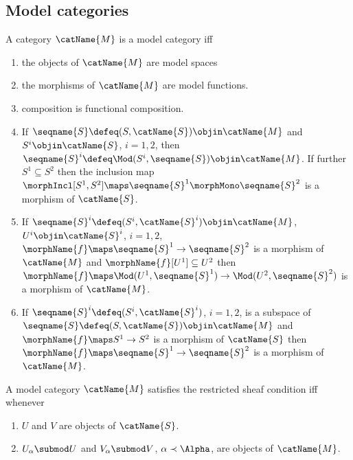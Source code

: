 \documentclass{article}
\begin{document}
\subsection{Model categories}
\begin{definition}
\label{def:modcat}
A category $\catName{M}$ is a model category iff

\begin{enumerate}
\item the objects of $\catName{M}$ are model spaces

\item the morphisms of $\catName{M}$ are model functions.

\item composition is functional composition.

\item
\label{modcat:inc}
If $\seqname{S} \defeq (S, \catName{S}) \objin \catName{M}$ and
$S^i \objin \catName{S}$, $i=1,2$, then
$\seqname{S}^i \defeq \Mod(S^i,\seqname{S}) \objin \catName{M}$.
If further $S^1 \subseteq S^2$ then the inclusion map
$\morphIncl[S^1,S^2] \maps \seqname{S}^1 \morphMono \seqname{S}^2$ is a morphism
of $\catName{S}$.

\item
\label{modcat:rest}
If $\seqname{S}^i \defeq (S^i, \catName{S}^i) \objin \catName{M}$,
$U^i \objin \catName{S}^i$,
$i=1,2$, $\morphName{f} \maps \seqname{S}^1 \to \seqname{S}^2$ is a
morphism of $\catName{M}$ and $\morphName{f}[U^1] \subseteq U^2$ then
$\morphName{f} \maps \Mod(U^1,\seqname{S}^1) \to \Mod(U^2,\seqname{S}^2)$
is a morphism of $\catName{M}$.

\item
\label{modcat:morph}
If $\seqname{S}^i \defeq ({S}^i, \catName{S}^i)$, $i=1,2$, is a
subspace of $\seqname{S} \defeq (S, \catName{S}) \objin \catName{M}$
and $\morphName{f} \maps S^1 \to S^2$ is a morphism of $\catName{S}$ then
$\morphName{f} \maps \seqname{S}^1 \to \seqname{S}^2$ is a morphism of
$\catName{M}$.
\end{enumerate}

A model category $\catName{M}$ satisfies the restricted
sheaf condition iff whenever
\begin{enumerate}
\item $U$ and $V$ are objects of $\catName{S}$.

\item $U_\alpha \submod U$ and $V_\alpha \submod V$,
$\alpha \prec \Alpha$, are objects of $\catName{M}$.


\end{enumerate}
\end{definition}
\end{document}
